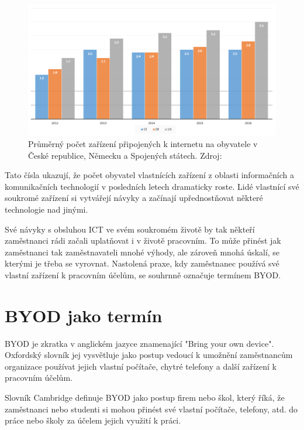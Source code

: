 \begin{figure}[h!]\label{pocetZarizeni}
\centering
\includegraphics[width=13cm]{img/pocetZarizeni}
\caption{Průměrný počet zařízení připojených k internetu na obyvatele v České republice, Německu a Spojených státech. Zdroj: } 
\end{figure}

Tato čísla ukazují, že počet obyvatel vlastnících zařízení z oblasti informačních a komunikačních technologií v posledních letech dramaticky roste. Lidé vlastnící své soukromé zařízení si vytvářejí návyky a začínají upřednostňovat některé technologie nad jinými.

Své návyky s obsluhou ICT ve svém soukromém životě by tak někteří zaměstnanci rádi začali uplatňovat i v životě pracovním. To může přinést jak zaměstnanci tak zaměstnavateli mnohé výhody, ale zároveň mnohá úskalí, se kterými je třeba se vyrovnat. Nastolená praxe, kdy zaměstnanec používá své vlastní zařízení k pracovním účelům, se souhrnně označuje termínem BYOD.



\section{BYOD jako termín}

BYOD je zkratka v anglickém jazyce znamenající "Bring your own device". Oxfordský slovník jej vysvětluje jako postup vedoucí k umožnění zaměstnancům organizace používat jejich vlastní počítače, chytré telefony a další zařízení k pracovním účelům.  

Slovník Cambridge definuje BYOD jako postup firem nebo škol, který říká, že zaměstnanci nebo studenti si mohou přinést své vlastní počítače, telefony, atd.  do práce nebo školy za účelem jejich využití k práci. 

